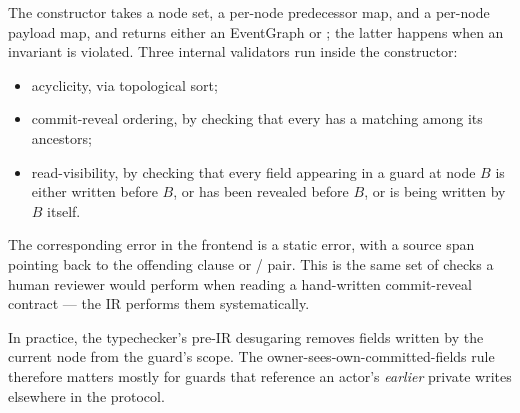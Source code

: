The constructor takes a node set, a per-node predecessor map, and
a per-node payload map, and returns either an EventGraph or
; the latter happens when an invariant is violated.
Three internal validators run inside the constructor:

\begin{itemize}\itemsep1pt
\item acyclicity, via topological sort;
\item commit-reveal ordering, by checking that every \REVEAL has
  a matching \COMMIT among its ancestors;
\item read-visibility, by checking that every field appearing in a
  guard at node $B$ is either written \PUBLIC before $B$, or has
  been revealed before $B$, or is being written by $B$ itself.
\end{itemize}

The corresponding error in the frontend is a static error, with a
source span pointing back to the offending  clause or
/ pair.  This is the same set of checks a
human reviewer would perform when reading a hand-written
commit-reveal contract --- the IR performs them
systematically.

In practice, the typechecker's pre-IR desugaring removes fields
written by the current node from the guard's scope.  The
owner-sees-own-committed-fields rule therefore matters mostly
for guards that reference an actor's \emph{earlier} private
writes elsewhere in the protocol.
